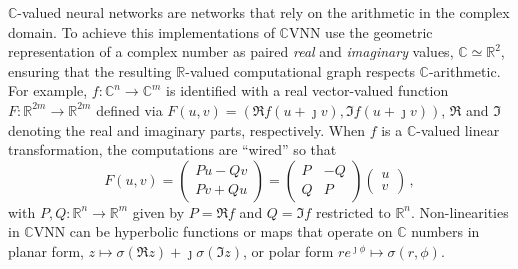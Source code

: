 \documentclass{article}
\newcommand{\real}{\mathbb{R}}
\newcommand{\cplx}{\mathbb{C}}
\newcommand{\iu}{{\jmath}}
\begin{document}
$\cplx$-valued neural networks are networks that rely on the arithmetic in the complex
domain. To achieve this implementations of $\cplx$VNN use the geometric representation
of a complex number as paired \emph{real} and \emph{imaginary} values, $\cplx \simeq \real^2$,
ensuring that the resulting $\real$-valued computational graph respects $\cplx$-arithmetic.
For example, $
  f\colon \cplx^n \to \cplx^m
$ is identified with a real vector-valued function $
  F\colon \real^{2 m} \to \real^{2 m}
$ defined via $
  F(u, v) = (\Re f(u + \iu v), \Im f(u + \iu v))
$, $\Re$ and $\Im$ denoting the real and imaginary parts, respectively. When $f$ is
a $\cplx$-valued linear transformation, the computations are ``wired'' so that
\begin{equation}  \label{eq:cplx-lin-op}
  F(u, v)
    =
    \begin{pmatrix}
      P u - Q v \\
      P v + Q u
    \end{pmatrix}
    = \begin{pmatrix}
      P & - Q \\ Q & P
    \end{pmatrix} \begin{pmatrix}
      u \\ v
    \end{pmatrix}
    \,,
\end{equation}
with $
  P, Q \colon \real^{n} \to \real^{m}
$ given by $P = \Re f$ and $Q = \Im f$ restricted to $\real^{n}$.
%
Non-linearities in $\cplx$VNN can be hyperbolic functions or maps that operate on
$\cplx$ numbers in planar form, $
  z \mapsto \sigma(\Re{z}) + \iu \sigma(\Im{z}) %
$, or polar form $
  r e^{\iu \phi} \mapsto \sigma(r, \phi)
$.
\end{document}
